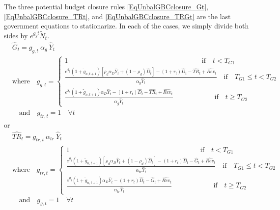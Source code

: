   The three potential budget closure rules \eqref{EqUnbalGBCclosure_Gt}, \eqref{EqUnbalGBCclosure_TRt}, and \eqref{EqUnbalGBCclosure_TRGt} are the last government equations to stationarize. In each of the cases, we simply divide both sides by $e^{g_y t}\tilde{N}_t$.
  \begin{equation}\label{EqStnrzClosureRule_Gt}
      \begin{split}
        &\hat{G}_t = g_{g,t}\:\alpha_{g}\: \hat{Y}_t \\
        &\text{where}\quad g_{g,t} =
          \begin{cases}
            1 \qquad\qquad\qquad\qquad\qquad\qquad\qquad\qquad\qquad\quad\:\:\text{if}\quad t < T_{G1} \\
            \frac{e^{g_y}\left(1 + \tilde{g}_{n,t+1}\right)\left[\rho_{d}\alpha_{D}\hat{Y}_{t} + (1-\rho_{d})\hat{D}_{t}\right] - (1+r_{t})\hat{D}_{t} - \hat{TR}_{t} + \hat{Rev}_{t}}{\alpha_g \hat{Y}_t} \quad\text{if}\quad T_{G1}\leq t<T_{G2} \\
            \frac{e^{g_y}\left(1 + \tilde{g}_{n,t+1}\right)\alpha_{D}\hat{Y}_{t} - (1+r_{t})\hat{D}_{t} - \hat{TR}_{t} + \hat{Rev}_{t}}{\alpha_g \hat{Y}_t} \qquad\qquad\qquad\text{if}\quad t \geq T_{G2}
          \end{cases} \\
        &\quad\text{and}\quad g_{tr,t} = 1 \quad\forall t
      \end{split}
    \end{equation}
  or
  \begin{equation}\label{EqStnrzClosureRule_TRt}
    \begin{split}
        &\hat{TR}_t = g_{tr,t}\:\alpha_{tr}\: \hat{Y}_t \\
        &\text{where}\quad g_{tr,t} =
          \begin{cases}
            1 \qquad\qquad\qquad\qquad\qquad\qquad\qquad\qquad\qquad\quad\text{if}\quad t < T_{G1} \\
            \frac{e^{g_y}\left(1 + \tilde{g}_{n,t+1}\right)\left[\rho_{d}\alpha_{D}\hat{Y}_{t} + (1-\rho_{d})\hat{D}_{t}\right] - (1+r_{t})\hat{D}_{t} - \hat{G}_{t} + \hat{Rev}_{t}}{\alpha_{tr} \hat{Y}_t} \quad\text{if}\quad T_{G1}\leq t<T_{G2} \\
            \frac{e^{g_y}\left(1 + \tilde{g}_{n,t+1}\right)\alpha_{D}\hat{Y}_{t} - (1+r_{t})\hat{D}_{t} - \hat{G}_{t} + \hat{Rev}_{t}}{\alpha_{tr} \hat{Y}_t} \qquad\qquad\qquad\text{if}\quad t \geq T_{G2}
          \end{cases} \\
      &\quad\text{and}\quad g_{g,t} = 1 \quad\forall t
      \end{split}
  \end{equation}
